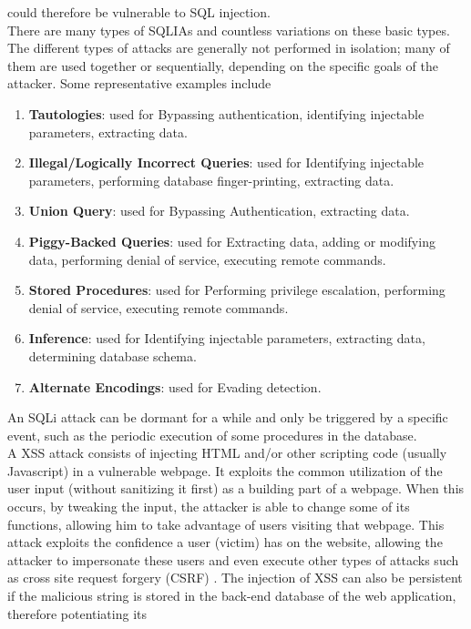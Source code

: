 could therefore be vulnerable to SQL injection.\\
\newline
There are many
types of SQLIAs and countless variations on these basic types. The different types of attacks are generally not performed in isolation; many of them are used together or sequentially, depending
on the specific goals of the attacker. Some representative examples include
\begin{enumerate}
	\item \textbf{Tautologies}: used for Bypassing authentication, identifying injectable parameters, extracting data.
	\item \textbf{Illegal/Logically Incorrect Queries}: used for  Identifying injectable parameters, performing database
	finger-printing, extracting data.
	\item \textbf{Union Query}: used for Bypassing Authentication, extracting data.
	\item \textbf{Piggy-Backed Queries}: used for Extracting data, adding or modifying data, performing denial of service, executing remote commands.
	\item \textbf{Stored Procedures}: used for Performing privilege escalation, performing denial of service, executing remote commands.
	\item \textbf{Inference}: used for Identifying injectable parameters, extracting data,
	determining database schema.
	\item \textbf{Alternate Encodings}: used for Evading detection.
\end{enumerate}
 An SQLi attack can be dormant for a while and
only be triggered by a specific event, such as the periodic
execution of some procedures in the database.
\\
\newline
A XSS attack consists of injecting HTML and/or other
scripting code (usually Javascript) in a vulnerable webpage. It exploits the common utilization of the user input
(without sanitizing it first) as a building part of a webpage.
When this occurs, by tweaking the input, the attacker is
able to change some of its functions, allowing him to take
advantage of users visiting that webpage. This attack
exploits the confidence a user (victim) has on the website,
allowing the attacker to impersonate these users and even
execute other types of attacks such as cross site request
forgery (CSRF)  \cite{1}. The injection of XSS can also be persistent if the malicious string is stored in the back-end database of the web application, therefore potentiating its

